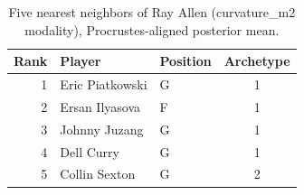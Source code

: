 \begin{table}[htbp]
  \centering\small
  \begin{tabular}{rllc}
    \toprule
    Rank & Player & Position & Archetype \\
    \midrule
    1 & Eric Piatkowski & G & 1 \\
    2 & Ersan Ilyasova & F & 1 \\
    3 & Johnny Juzang & G & 1 \\
    4 & Dell Curry & G & 1 \\
    5 & Collin Sexton & G & 2 \\
    \bottomrule
  \end{tabular}
  \caption{Five nearest neighbors of Ray Allen (curvature_m2 modality), Procrustes-aligned posterior mean.}
  \label{tab:Ray_Allen_neighbors_curvature_m2}
\end{table}

